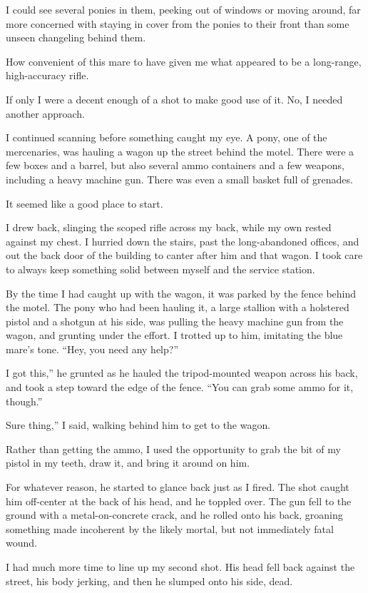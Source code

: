 I could see several ponies in them, peeking out of windows or moving around, far more concerned with staying in cover from the ponies to their front than some unseen changeling behind them.

How convenient of this mare to have given me what appeared to be a long-range, high-accuracy rifle.

If only I were a decent enough of a shot to make good use of it. No, I needed another approach.

I continued scanning before something caught my eye. A pony, one of the mercenaries, was hauling a wagon up the street behind the motel. There were a few boxes and a barrel, but also several ammo containers and a few weapons, including a heavy machine gun. There was even a small basket full of grenades.

It seemed like a good place to start.

I drew back, slinging the scoped rifle across my back, while my own rested against my chest. I hurried down the stairs, past the long-abandoned offices, and out the back door of the building to canter after him and that wagon. I took care to always keep something solid between myself and the service station.

By the time I had caught up with the wagon, it was parked by the fence behind the motel. The pony who had been hauling it, a large stallion with a holstered pistol and a shotgun at his side, was pulling the heavy machine gun from the wagon, and grunting under the effort. I trotted up to him, imitating the blue mare’s tone. “Hey, you need any help?”

\leavevmode{}I got this,” he grunted as he hauled the tripod-mounted weapon across his back, and took a step toward the edge of the fence. “You can grab some ammo for it, though.”

\leavevmode{}Sure thing,” I said, walking behind him to get to the wagon.

Rather than getting the ammo, I used the opportunity to grab the bit of my pistol in my teeth, draw it, and bring it around on him.

For whatever reason, he started to glance back just as I fired. The shot caught him off-center at the back of his head, and he toppled over. The gun fell to the ground with a metal-on-concrete crack, and he rolled onto his back, groaning something made incoherent by the likely mortal, but not immediately fatal wound.

I had much more time to line up my second shot. His head fell back against the street, his body jerking, and then he slumped onto his side, dead.

